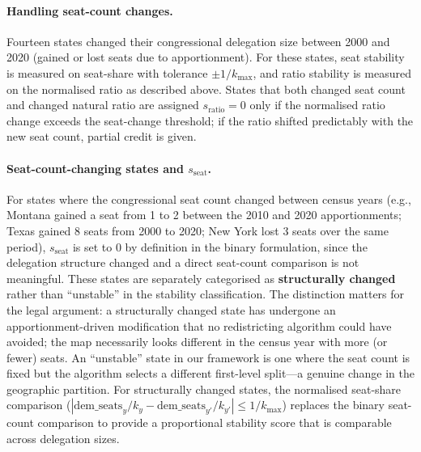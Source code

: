 \paragraph{Handling seat-count changes.}
Fourteen states changed their congressional delegation size between 2000 and
2020 (gained or lost seats due to apportionment).
For these states, seat stability is measured on seat-share with tolerance
$\pm 1/k_{\max}$, and ratio stability is measured on the normalised ratio
as described above.
States that both changed seat count and changed natural ratio are assigned
$s_{\text{ratio}} = 0$ only if the normalised ratio change exceeds the
seat-change threshold; if the ratio shifted predictably with the new seat
count, partial credit is given.

\paragraph{Seat-count-changing states and $s_{\text{seat}}$.}
For states where the congressional seat count changed between census years
(e.g., Montana gained a seat from 1 to 2 between the 2010 and 2020
apportionments; Texas gained 8 seats from 2000 to 2020; New York lost 3
seats over the same period), $s_{\text{seat}}$ is set to $0$ by definition
in the binary formulation, since the delegation structure changed and a direct
seat-count comparison is not meaningful.
These states are separately categorised as \textbf{structurally changed} rather
than ``unstable'' in the stability classification.
The distinction matters for the legal argument: a structurally changed state
has undergone an apportionment-driven modification that no redistricting
algorithm could have avoided; the map necessarily looks different in the
census year with more (or fewer) seats.
An ``unstable'' state in our framework is one where the seat count is fixed
but the algorithm selects a different first-level split---a genuine change in
the geographic partition.
For structurally changed states, the normalised seat-share comparison
($|\text{dem\_seats}_y/k_y - \text{dem\_seats}_{y'}/k_{y'}| \leq 1/k_{\max}$)
replaces the binary seat-count comparison to provide a proportional stability
score that is comparable across delegation sizes.

